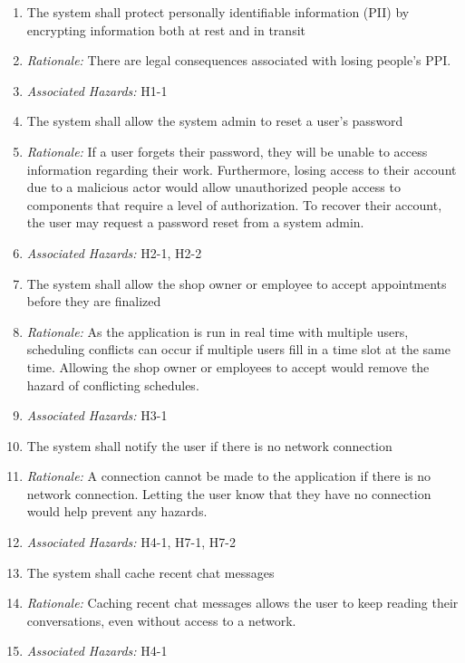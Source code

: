 \documentclass{article}
\begin{document}
\begin{enumerate}[label=SR\arabic*.]
	\item The system shall protect personally identifiable information (PII) by encrypting information both
	      at rest and in transit
	\item[] \emph{Rationale:} There are legal consequences associated with losing people's PPI.
	\item[] \emph{Associated Hazards:} H1-1 \\

	\item The system shall allow the system admin to reset a user's password
	\item[] \emph{Rationale:} If a user forgets their password, they will be unable to access information
		regarding their work. Furthermore, losing access to their account due to a malicious actor would
		allow unauthorized people access to components that require a level of authorization. To recover
		their account, the user may request a password reset from a system admin.
	\item[] \emph{Associated Hazards:} H2-1, H2-2 \\

	\item The system shall allow the shop owner or employee to accept appointments before they are finalized
	\item[] \emph{Rationale:} As the application is run in real time with multiple users, scheduling conflicts
		can occur if multiple users fill in a time slot at the same time. Allowing the shop owner or employees
		to accept would remove the hazard of conflicting schedules.
	\item[] \emph{Associated Hazards:} H3-1 \\

	\item The system shall notify the user if there is no network connection
	\item[] \emph{Rationale:} A connection cannot be made to the application if there is no network connection.
		Letting the user know that they have no connection would help prevent any hazards.
	\item[] \emph{Associated Hazards:} H4-1, H7-1, H7-2 \\

	\item The system shall cache recent chat messages
	\item[] \emph{Rationale:} Caching recent chat messages allows the user to keep reading their conversations,
		even without access to a network.
	\item[] \emph{Associated Hazards:} H4-1 \\


\end{enumerate}
\end{document}
